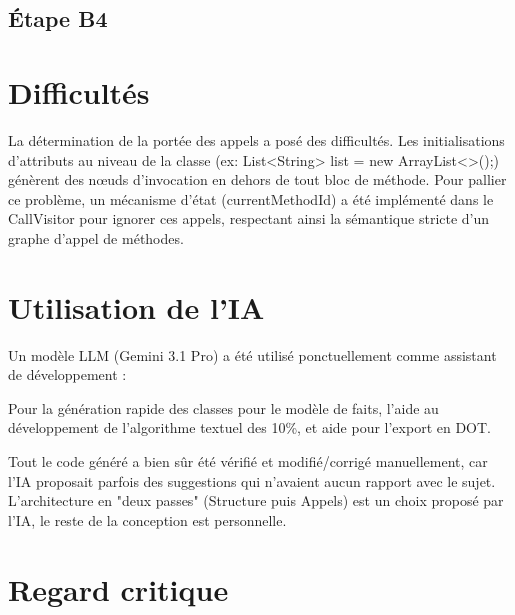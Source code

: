 \documentclass{Templates/customArticle}
\begin{document}


\subsection{Étape B4}


\section{Difficultés}

La détermination de la portée des appels a posé des difficultés. Les initialisations d'attributs au niveau de la classe (ex: List<String> list = new ArrayList<>();) génèrent des nœuds d'invocation en dehors de tout bloc de méthode. Pour pallier ce problème, un mécanisme d'état (currentMethodId) a été implémenté dans le CallVisitor pour ignorer ces appels, respectant ainsi la sémantique stricte d'un graphe d'appel de méthodes.

\section{Utilisation de l'IA}

Un modèle LLM (Gemini 3.1 Pro) a été utilisé ponctuellement comme assistant de développement :

Pour la génération rapide des classes pour le modèle de faits, l'aide au développement de l'algorithme textuel des 10\%, et aide pour l'export en DOT.

Tout le code généré a bien sûr été vérifié et modifié/corrigé manuellement, car l'IA proposait parfois des suggestions qui n'avaient aucun rapport avec le sujet. L'architecture en "deux passes" (Structure puis Appels) est un choix proposé par l'IA, le reste de la conception est personnelle.

\section{Regard critique}
\end{document}
